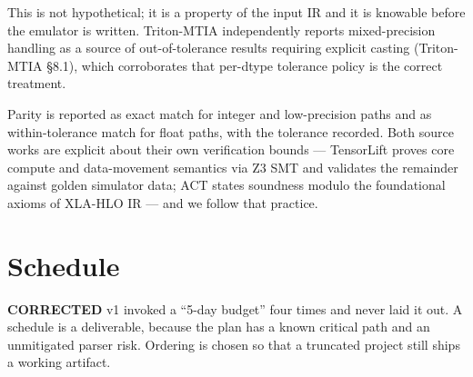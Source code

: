 \documentclass[11pt,a4paper]{article}
\newcommand{\falsified}{\textbf{\textcolor{red!75!black}{CORRECTED}}}
\begin{document}
\noindent This is not hypothetical; it is a property of the input IR and it is knowable before the emulator
is written. Triton-MTIA independently reports mixed-precision handling as a source of out-of-tolerance
results requiring explicit casting (Triton-MTIA \S8.1), which corroborates that per-dtype tolerance policy is
the correct treatment.

\noindent Parity is reported as exact match for integer and low-precision paths and as within-tolerance match
for float paths, with the tolerance recorded. Both source works are explicit about their own verification
bounds --- TensorLift proves core compute and data-movement semantics via Z3 SMT and validates the remainder
against golden simulator data; ACT states soundness modulo the foundational axioms of XLA-HLO IR --- and we
follow that practice.

\clearpage
\section{Schedule}\label{sec:schedule}

\falsified{} v1 invoked a ``5-day budget'' four times and never laid it out. A schedule is a deliverable,
because the plan has a known critical path and an unmitigated parser risk. Ordering is chosen so that a
truncated project still ships a working artifact.
\end{document}
